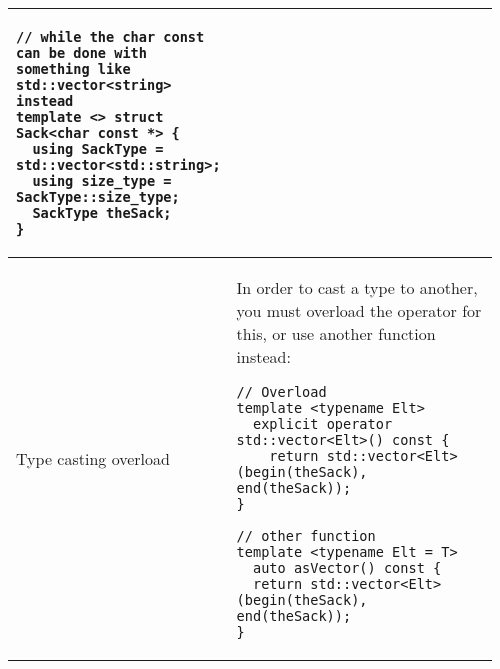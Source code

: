 \documentclass[main.tex,fontsize=8pt,paper=a4,paper=portrait,DIV=calc]{scrartcl}
\begin{document}
\begin{table}[ht!]
\begin{tabular}{|m{0.2\linewidth}|m{0.755\linewidth}|}
\begin{lstlisting}
// while the char const can be done with something like std::vector<string> instead
template <> struct Sack<char const *> {
  using SackType = std::vector<std::string>;
  using size_type = SackType::size_type;
  SackType theSack;
}
\end{lstlisting}\\
\hline
Type casting overload & 
In order to cast a type to another, you must overload the operator for this, or use another function instead:\newline
\begin{lstlisting}
// Overload 
template <typename Elt>
  explicit operator std::vector<Elt>() const {
    return std::vector<Elt>(begin(theSack), end(theSack));
}

// other function 
template <typename Elt = T>
  auto asVector() const {
  return std::vector<Elt>(begin(theSack), end(theSack));
}
\end{lstlisting}\\
\hline
\end{tabular}
\end{table}
\pagebreak 
\end{document}
